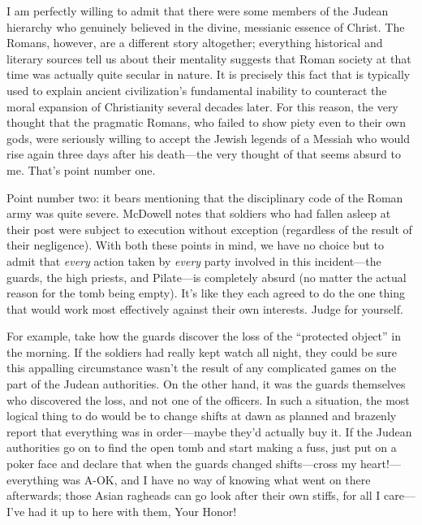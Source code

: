 I am perfectly willing to admit that there were some members of the Judean hierarchy who genuinely believed in the divine, messianic essence of Christ. The Romans, however, are a different story altogether; everything historical and literary sources tell us about their mentality suggests that Roman society at that time was actually quite secular in nature. It is precisely this fact that is typically used to explain ancient civilization's fundamental inability to counteract the moral expansion of Christianity several decades later. For this reason, the very thought that the pragmatic Romans, who failed to show piety even to their own gods, were seriously willing to accept the Jewish legends of a Messiah who would rise again three days after his death---the very thought of that seems absurd to me. That's point number one.

Point number two: it bears mentioning that the disciplinary code of the Roman army was quite severe. McDowell notes that soldiers who had fallen asleep at their post were subject to execution without exception (regardless of the result of their negligence). With both these points in mind, we have no choice but to admit that \emph{every} action taken by \emph{every} party involved in this incident---the guards, the high priests, and Pilate---is completely absurd (no matter the actual reason for the tomb being empty). It's like they each agreed to do the one thing that would work most effectively against their own interests. Judge for yourself.

For example, take how the guards discover the loss of the ``protected object'' in the morning. If the soldiers had really kept watch all night, they could be sure this appalling circumstance wasn't the result of any complicated games on the part of the Judean authorities. On the other hand, it was the guards themselves who discovered the loss, and not one of the officers. In such a situation, the most logical thing to do would be to change shifts at dawn as planned and brazenly report that everything was in order---maybe they'd actually buy it. If the Judean authorities go on to find the open tomb and start making a fuss, just put on a poker face and declare that when the guards changed shifts---cross my heart!---everything was A-OK, and I have no way of knowing what went on there afterwards; those Asian ragheads can go look after their own stiffs, for all I care---I've had it up to here with them, Your Honor! 

